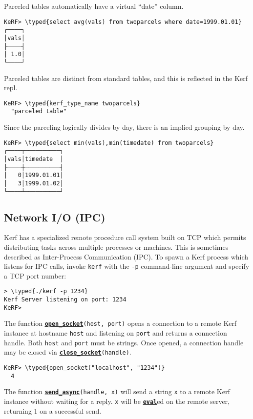 \documentclass{article}
\newcommand{\typed}[1]{\textcolor{TealBlue}{#1}}
\newcommand{\primu}[2]{\hyperref[prim:#2]{\textbf{\texttt{#1}}}}
\newcommand{\prim}[1]{\primu{#1}{#1}}
\begin{document}
Parceled tables automatically have a virtual ``date'' column.
\begin{Verbatim}
KeRF> \typed{select avg(vals) from twoparcels where date=1999.01.01}
┌────┐
│vals│
├────┤
│ 1.0│
└────┘
\end{Verbatim}

Parceled tables are distinct from standard tables, and this is reflected in the Kerf repl.
\begin{Verbatim}
KeRF> \typed{kerf_type_name twoparcels}
  "parceled table"
\end{Verbatim}

Since the parceling logically divides by day, there is an implied grouping by day.
\begin{Verbatim}
KeRF> \typed{select min(vals),min(timedate) from twoparcels}
┌────┬──────────┐
│vals│timedate  │
├────┼──────────┤
│   0│1999.01.01│
│   3│1999.01.02│
└────┴──────────┘
\end{Verbatim}

\pagebreak

\subsection{Network I/O (IPC)}\label{sec:netio}
Kerf has a specialized remote procedure call system built on TCP which permits distributing tasks across multiple processes or machines. This is sometimes described as Inter-Process Communication (IPC). To spawn a Kerf process which listens for IPC calls, invoke \texttt{kerf} with the \texttt{-p} command-line argument and specify a TCP port number:

\begin{Verbatim}
> \typed{./kerf -p 1234}
Kerf Server listening on port: 1234
KeRF>  
\end{Verbatim}

The function \primu{open\_socket}{openSocket}\texttt{(host, port)} opens a connection to a remote Kerf instance at hostname \texttt{host} and listening on \texttt{port} and returns a connection handle. Both \texttt{host} and \texttt{port} must be strings. Once opened, a connection handle may be closed via \primu{close\_socket}{closeSocket}\texttt{(handle)}.

\begin{Verbatim}
KeRF> \typed{open_socket("localhost", "1234")}
  4
\end{Verbatim}

The function \primu{send\_async}{sendAsync}\texttt{(handle, x)} will send a string \texttt{x} to a remote Kerf instance without waiting for a reply. \texttt{x} will be \prim{eval}ed on the remote server, returning 1 on a successful send.
\end{document}
